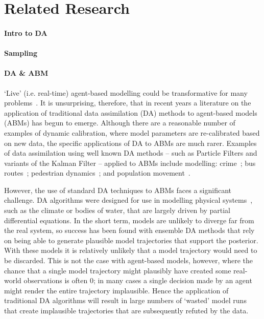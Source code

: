 \section{Related Research}\label{sec:background}

\paragraph{Intro to DA}


\paragraph{Sampling}


\paragraph{DA \& ABM}

`Live' (i.e. real-time) agent-based modelling could be transformative for many problems~\cite{swarup_live_2020}. It is unsurprising, therefore, that in recent years a literature on the application of traditional data assimilation (DA) methods to agent-based models (ABMs) has begun to emerge. Although there are a reasonable number of examples of dynamic calibration, where model parameters are re-calibrated based on new data, the specific applications of DA to ABMs are much rarer. Examples of data assimilation using well known DA methods -- such as Particle Filters and variants of the Kalman Filter -- applied to ABMs include modelling:
crime~\cite{lloyd_exploring_2016};
bus routes~\cite{kieu_dealing_2020};
pedestrian dynamics~\cite{wang_data_2015, ward_dynamic_2016, clay_realtime_2020, malleson_simulating_2020};
and population movement~\cite{lueck_who_2019}. 

However, the use of standard DA techniques to ABMs faces a significant challenge. DA algorithms were designed for use in modelling physical systems~\cite{lewis_dynamic_2006}, such as the climate or bodies of water, that are largely driven by partial differential equations. In the short term, models are unlikely to diverge far from the real system, so success has been found with ensemble DA methods that rely on being able to generate plausible model trajectories that support the posterior. With these models it is relatively unlikely that a model trajectory would need to be discarded.
This is not the case with agent-based models, however, where the chance that a single model trajectory might plausibly have created some real-world observations is often 0; in many cases a single decision made by an agent might render the entire trajectory implausible. Hence the application of traditional DA algorithms will result in large numbers of `wasted' model runs that create implausible trajectories that are subsequently refuted by the data. 

